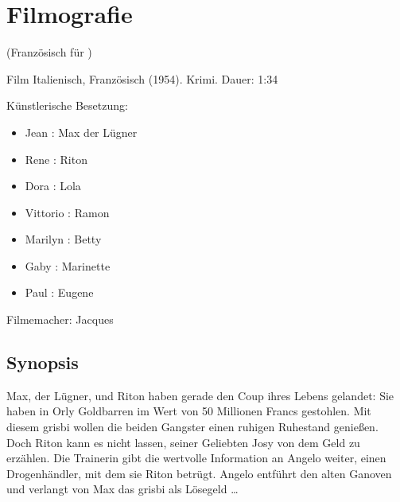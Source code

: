 \section{Filmografie\label{preamble-filmography}}

 (Französisch für )

Film Italienisch, Französisch (1954). Krimi. Dauer: 1:34

Künstlerische Besetzung:

\begin{itemize}
    \item Jean : Max der Lügner
    \item Rene : Riton
    \item Dora : Lola
    \item Vittorio : Ramon
    \item Marilyn : Betty
    \item Gaby : Marinette
    \item Paul : Eugene
\end{itemize}

Filmemacher: Jacques 

\subsection*{Synopsis}


Max, der Lügner, und Riton haben gerade den Coup ihres Lebens gelandet: Sie haben in Orly Goldbarren im Wert von 50 Millionen Francs gestohlen. Mit diesem \glqq{}grisbi\grqq{} wollen die beiden Gangster einen ruhigen Ruhestand genießen. Doch Riton kann es nicht lassen, seiner Geliebten Josy von dem Geld zu erzählen. Die Trainerin gibt die wertvolle Information an Angelo weiter, einen Drogenhändler, mit dem sie Riton betrügt. Angelo entführt den alten Ganoven und verlangt von Max das \glqq{}grisbi\grqq{} als Lösegeld \dots{}

